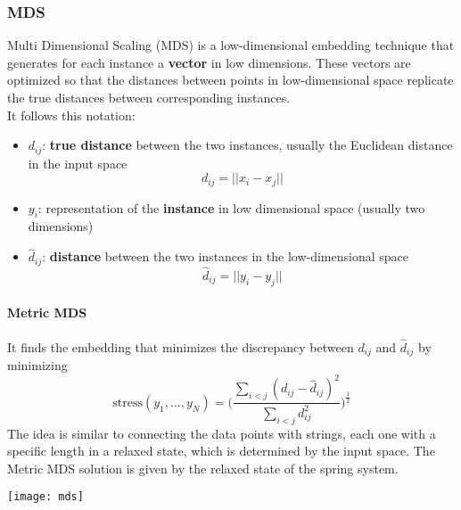\subsubsection{MDS}
Multi Dimensional Scaling (MDS) is a low-dimensional embedding technique that generates for each instance a \textbf{vector} in low dimensions. These vectors are optimized so that the distances between points in low-dimensional space replicate the true distances between corresponding instances.\\
It follows this notation:
\begin{itemize}
	\item $d_{ij}$: \textbf{true distance} between the two instances, usually the Euclidean distance in the input space
	\begin{equation*}
		d_{ij} = \lvert\lvert x_i - x_j \rvert\rvert
	\end{equation*}
	\item $y_i$:  representation of the \textbf{instance} in low dimensional space (usually two dimensions)
	\item $\hat{d}_{ij}$: \textbf{distance} between the two instances in the low-dimensional space
	\begin{equation*}
		\hat{d}_{ij} = \lvert\lvert y_i - y_j \rvert\rvert
	\end{equation*}
\end{itemize}

\paragraph{Metric MDS}
It finds the embedding that minimizes the discrepancy between $d_{ij}$ and $\hat{d}_{ij}$ by minimizing
\begin{equation}
	\text{stress}(y_1, \ldots, y_N) = \bigg(\frac{\sum_{i<j}(d_{ij} - \hat{d}_{ij})^2}{\sum_{i<j}d^2_{ij}}\bigg)^\frac{1}{2}
\end{equation} 
The idea is similar to connecting the data points with strings, each one with a specific length in a relaxed state, which is determined by the input space. The Metric MDS solution is given by the relaxed state of the spring system.

\begin{center}
	\texttt{[image: mds]}
\end{center}


